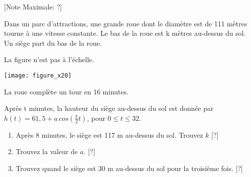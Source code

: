 \begin{question}
  \hspace*{\fill} [Note Maximale: ?]\par
  \noindent Dans un parc d'attractions, une grande roue dont le diamètre est de 111 mètres tourne à une vitesse constante. Le bas de la roue est k mètres au-dessus du sol. Un siège part du bas de la roue.\par
  \medskip
  \begin{center} %
    \noindent La figure n'est pas à l'échelle.\par
    \texttt{[image: figure\_x20]}\par
    \noindent La roue complète un tour en 16 minutes.\par
  \end{center} %

  \noindent Après t minutes, la hauteur du siège au-dessus du sol est donnée par $h(t) = 61,5 + a\,cos\left(\frac{\pi}{2}t\right)$, pour $0 \le t \le 32$.\par
  \begin{enumerate}[label=(\alph*)]
    \item Après 8 minutes, le siège est 117 m au-dessus du sol. Trouvez $k$\hspace*{\fill} [?]
    \item Trouvez la valeur de $a$.\hspace*{\fill} [?]
    \item Trouvez quand le siège est 30 m au-dessus du sol pour la troisième fois.\hspace*{\fill} [?]
  \end{enumerate}
\end{question}
